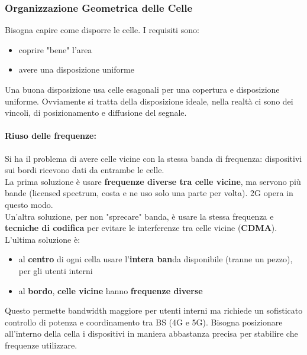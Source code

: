\subsubsection{Organizzazione Geometrica delle Celle}

Bisogna capire come disporre le celle. I requisiti sono:
\begin{itemize}
	\item coprire "bene" l'area
	\item avere una disposizione uniforme
\end{itemize}

Una buona disposizione usa celle esagonali per una copertura e disposizione uniforme. Ovviamente si tratta della disposizione ideale, nella realtà ci sono dei vincoli, di posizionamento e diffusione del segnale.\\

\paragraph{Riuso delle frequenze:} Si ha il problema di avere celle vicine con la stessa banda di frequenza: dispositivi sui bordi ricevono dati da entrambe le celle. \\

La prima soluzione è usare \textbf{frequenze diverse tra celle vicine}, ma servono più bande (licensed spectrum, costa e ne uso solo una parte per volta). 2G opera in questo modo.\\

Un'altra soluzione, per non "sprecare" banda, è usare la stessa frequenza e \textbf{tecniche di codifica} per evitare le interferenze tra celle vicine (\textbf{CDMA}).\\

L'ultima soluzione è:
\begin{itemize}
	\item al \textbf{centro} di ogni cella usare l'\textbf{intera ban}da disponibile (tranne un pezzo), per gli utenti interni
	\item al \textbf{bordo}, \textbf{celle vicine} hanno \textbf{frequenze diverse}
\end{itemize}

Questo permette bandwidth maggiore per utenti interni ma richiede un sofisticato controllo di potenza e coordinamento tra BS (4G e 5G). Bisogna posizionare all'interno della cella i dispositivi in maniera abbastanza precisa per stabilire che frequenze utilizzare. \\

